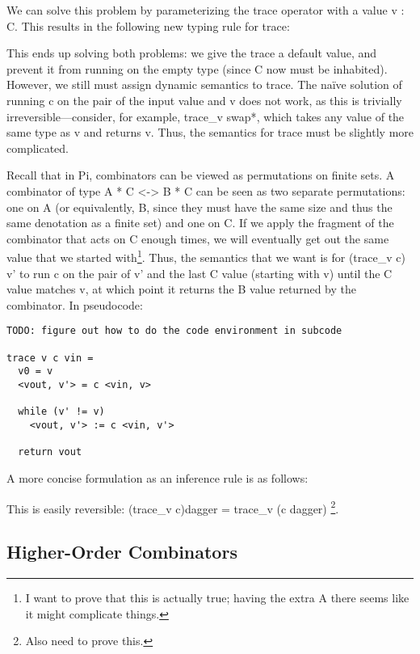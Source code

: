 \documentclass{llncs}
\begin{document}
We can solve this problem by parameterizing the trace operator with a value {{v
: C}}. This results in the following new typing rule for trace:


\noindent
This ends up solving both problems: we give the trace a default value, and
prevent it from running on the empty type (since {{C}} now must be inhabited).
However, we still must assign dynamic semantics to trace. The na\"ive solution
of running {{c}} on the pair of the input value and {{v}} does not work, as this
is trivially irreversible---consider, for example, {{trace_v swap*}}, which
takes any value of the same type as {{v}} and returns {{v}}. Thus, the semantics
for {{trace}} must be slightly more complicated.

Recall that in {{Pi}}, combinators can be viewed as permutations on finite sets.
A combinator of type {{A * C <-> B * C}} can be seen as two separate
permutations: one on {{A}} (or equivalently, B, since they must have the same
size and thus the same denotation as a finite set) and one on {{C}}. If we
apply the fragment of the combinator that acts on {{C}} enough times, we will
eventually get out the same value that we started with\footnote{I want to prove
that this is actually true; having the extra {{A}} there seems like it might
complicate things.}. Thus, the semantics that we want is for {{(trace_v c) v'}}
to run {{c}} on the pair of {{v'}} and the last {{C}} value (starting with
{{v}}) until the {{C}} value matches {{v}}, at which point it returns the {{B}}
value returned by the combinator. In pseudocode:

\begin{verbatim}
TODO: figure out how to do the code environment in subcode

trace v c vin =
  v0 = v
  <vout, v'> = c <vin, v>

  while (v' != v)
    <vout, v'> := c <vin, v'>

  return vout
\end{verbatim}

A more concise formulation as an inference rule is as follows:


This is easily reversible: {{(trace_v c)dagger = trace_v (c dagger)}}
\footnote{Also need to prove this.}.

\subsection{Higher-Order Combinators}
\end{document}
